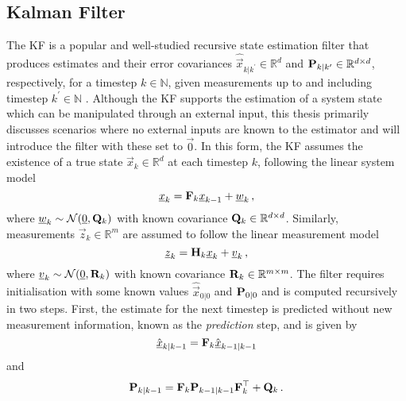 \subsection{Kalman Filter}\label{subsec:prelims:kf}
The KF \cite{andersonOptimalFiltering1979,kalmanNewApproachLinear1960} is a popular and well-studied recursive state estimation filter that produces estimates and their error covariances $\hat{\vec{x}}_{k|k^\prime} \in \mathbb{R}^d$ and ${{\mathbf{P}}}_{k|k^\prime} \in \mathbb{R}^{d \times d}$, respectively, for a timestep $k \in \mathbb{N}$, given measurements up to and including timestep $k^\prime \in \mathbb{N}$ \cite{simonOptimalStateEstimation2006,haugBayesianEstimationTracking2012,crassidisOptimalEstimationDynamic2004,chuiKalmanFilteringRealTime2013}. Although the KF supports the estimation of a system state which can be manipulated through an external input, this thesis primarily discusses scenarios where no external inputs are known to the estimator and will introduce the filter with these set to $\vec{0}$. In this form, the KF assumes the existence of a true state $\vec{x}_k \in \mathbb{R}^d$ at each timestep $k$, following the linear system model
\begin{equation}\label{eq:prelims:lin_gauss_system_model}
    {\underline{x}}_k = {{\mathbf{F}}}_k {\underline{x}}_{k-1} + {\underline{w}}_k\,,
\end{equation}
where ${\underline{w}}_k \sim \mathcal{N}({\underline{0}}, {{\mathbf{Q}}}_k)$ with known covariance ${{\mathbf{Q}}}_k \in \mathbb{R}^{d \times d}$. Similarly, measurements $\vec{z}_k \in \mathbb{R}^m$ are assumed to follow the linear measurement model
\begin{equation}\label{eq:prelims:lin_gauss_measurement_model}
    {\underline{z}}_k = {{\mathbf{H}}}_k {\underline{x}}_k + {\underline{v}}_k\,,
\end{equation}
where ${\underline{v}}_k \sim \mathcal{N}({\underline{0}}, {{\mathbf{R}}}_k)$ with known covariance ${{\mathbf{R}}}_k \in \mathbb{R}^{m \times m}$. The filter requires initialisation with some known values $\hat{\vec{x}}_{0|0}$ and ${{\mathbf{P}}}_{0|0}$ and is computed recursively in two steps. First, the estimate for the next timestep is predicted without new measurement information, known as the \textit{prediction} step, and is given by
\begin{equation}\label{eq:prelims:kf_est_predict}
    \hat{{\underline{x}}}_{k|k-1} = {{\mathbf{F}}}_k \hat{{\underline{x}}}_{k-1|k-1}
\end{equation}
and
\begin{equation}\label{eq:prelims:kf_cov_predict}
    {\ensuremath{{\mathbf{P}}}}_{k|k-1} = {{\mathbf{F}}}_k {{\mathbf{P}}}_{k-1|k-1} {{\mathbf{F}}}_k^\top + {{\mathbf{Q}}}_k\,.
\end{equation}
